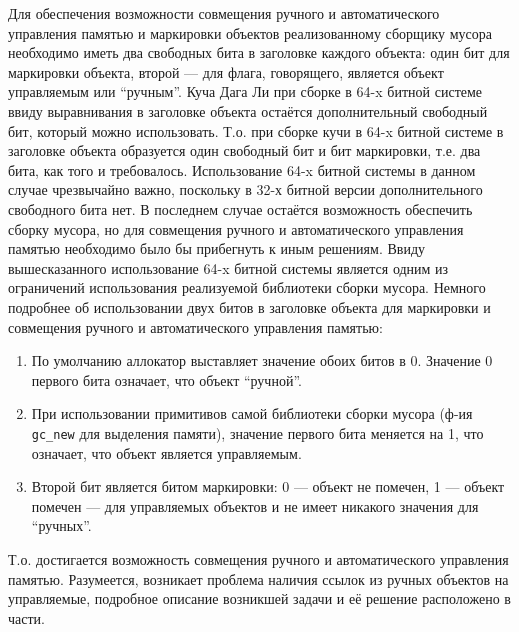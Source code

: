 Для обеспечения возможности совмещения ручного и автоматического управления памятью и маркировки объектов
реализованному сборщику мусора необходимо иметь два свободных бита в заголовке каждого объекта:
один бит для маркировки объекта, второй --- для флага, говорящего, является объект
управляемым или ``ручным''.
Куча Дага Ли при сборке в 64-x битной
системе ввиду выравнивания в заголовке объекта остаётся дополнительный свободный бит, который можно использовать.
Т.о. при сборке кучи в 64-x битной системе в заголовке объекта образуется один свободный бит
и бит маркировки, т.е. два бита, как того и требовалось.
Использование 64-x битной системы в данном случае чрезвычайно важно,
поскольку в 32-х битной версии дополнительного свободного бита нет. В последнем случае остаётся возможность
обеспечить сборку мусора, но для совмещения ручного и автоматического управления памятью необходимо было бы прибегнуть к
иным решениям. Ввиду вышесказанного использование 64-x битной системы является одним из ограничений
использования реализуемой библиотеки сборки мусора.
Немного подробнее об использовании двух битов в заголовке объекта для маркировки и совмещения ручного и автоматического
управления памятью:
\begin{enumerate}
\item По умолчанию аллокатор выставляет значение обоих битов в 0. Значение 0 первого бита означает, что объект ``ручной''.
\item При использовании примитивов самой библиотеки сборки мусора (ф-ия \lstinline[language= cpp]{gc_new} для выделения памяти),
	значение первого бита меняется на 1, что означает, что объект является управляемым.
\item Второй бит является битом маркировки: 0 --- объект не помечен, 1 --- объект помечен --- для управляемых
	объектов и не имеет никакого значения для ``ручных''.
\end{enumerate}
Т.о. достигается возможность совмещения ручного и автоматического управления памятью.
Разумеется, возникает проблема наличия ссылок из ручных объектов на управляемые,
подробное описание возникшей задачи и её решение расположено в части.

